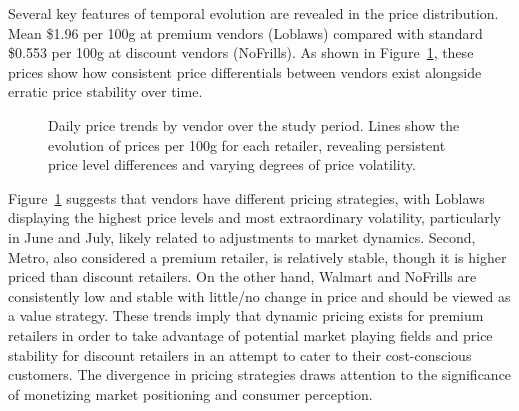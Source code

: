 \documentclass[
  letterpaper,
  DIV=11,
  numbers=noendperiod]{scrartcl}
\begin{document}
Several key features of temporal evolution are revealed in the price
distribution. Mean \$1.96 per 100g at premium vendors (Loblaws) compared
with standard \$0.553 per 100g at discount vendors (NoFrills). As shown
in Figure~\ref{fig-price-time}, these prices show how consistent price
differentials between vendors exist alongside erratic price stability
over time.

\begin{figure}[H]


\caption{\label{fig-price-time}Daily price trends by vendor over the
study period. Lines show the evolution of prices per 100g for each
retailer, revealing persistent price level differences and varying
degrees of price volatility.}

\end{figure}%

Figure~\ref{fig-price-time} suggests that vendors have different pricing
strategies, with Loblaws displaying the highest price levels and most
extraordinary volatility, particularly in June and July, likely related
to adjustments to market dynamics. Second, Metro, also considered a
premium retailer, is relatively stable, though it is higher priced than
discount retailers. On the other hand, Walmart and NoFrills are
consistently low and stable with little/no change in price and should be
viewed as a value strategy. These trends imply that dynamic pricing
exists for premium retailers in order to take advantage of potential
market playing fields and price stability for discount retailers in an
attempt to cater to their cost-conscious customers. The divergence in
pricing strategies draws attention to the significance of monetizing
market positioning and consumer perception.
\end{document}
